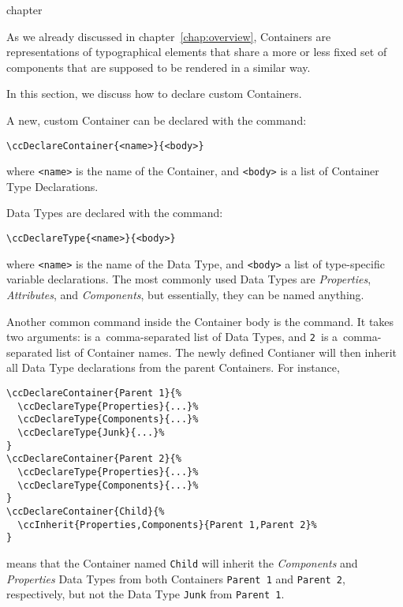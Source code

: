 \begin{Heading}{chapter}
\end{Heading}


As we already discussed in chapter~\ref{chap:overview},
Containers are representations of typographical
elements that share a more or less fixed set of components that are
supposed to be rendered in a similar way.

In this section, we discuss how to declare custom Containers.

A new, custom Container can be declared with the
\DeclareMacro{\ccDeclareContainer} command:
\begin{lstlisting}
\ccDeclareContainer{<name>}{<body>}
\end{lstlisting}
where \lstinline{<name>} is the name of the Container, and
\lstinline{<body>} is a list of Container Type Declarations.

Data Types are declared with the \DeclareMacro{\ccDeclareType} command:
\begin{lstlisting}
\ccDeclareType{<name>}{<body>}
\end{lstlisting}
where \lstinline{<name>} is the name of the Data Type, and
\lstinline{<body>} a list of type-specific variable declarations. The
most commonly used Data Types are \textit{Properties},
\textit{Attributes}, and \textit{Components}, but essentially, they
can be named anything.

Another common command inside the Container body is the
\DeclareMacro{\ccInherit} command. It takes two arguments:
 is a~comma-separated list of Data Types, and
\lstinline{2}~is a~comma-separated list of Container names. The newly
defined Contianer will then inherit all Data Type declarations from
the parent Containers. For instance,
\begin{lstlisting}
\ccDeclareContainer{Parent 1}{%
  \ccDeclareType{Properties}{...}%
  \ccDeclareType{Components}{...}%
  \ccDeclareType{Junk}{...}%
}
\ccDeclareContainer{Parent 2}{%
  \ccDeclareType{Properties}{...}%
  \ccDeclareType{Components}{...}%
}
\ccDeclareContainer{Child}{%
  \ccInherit{Properties,Components}{Parent 1,Parent 2}%
}
\end{lstlisting}
means that the Container named \lstinline{Child} will inherit the
\textit{Components} and \textit{Properties} Data Types from both
Containers \lstinline{Parent 1} and \lstinline{Parent 2},
respectively, but not the Data Type \lstinline{Junk} from \lstinline{Parent 1}.

